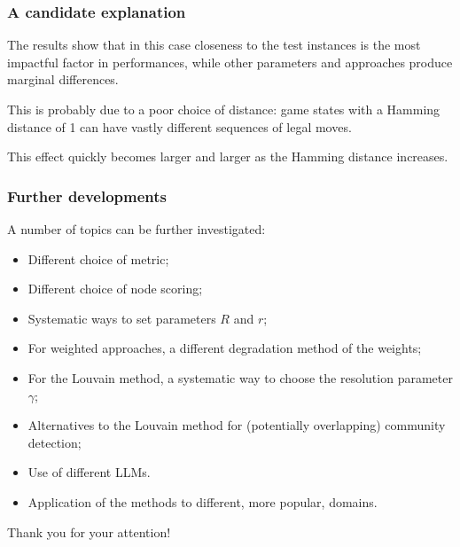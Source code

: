 \documentclass{beamer}
\theoremstyle{definition}
\theoremstyle{plain}
\theoremstyle{Remark}
\begin{document}
	
	\begin{frame}
		\frametitle{A candidate explanation}
		The results show that in this case closeness to the test instances is the most impactful factor in performances, while other parameters and approaches produce marginal differences.\pause \bigskip
		
		This is probably due to a poor choice of distance: game states with a Hamming distance of 1 can have vastly different sequences of legal moves. \pause \bigskip
		
		This effect quickly becomes larger and larger as the Hamming distance increases.
		

		
		
		
		
		
	\end{frame}
		
	\begin{frame}
		\frametitle{Further developments}
		A number of topics can be further investigated:\pause
		\begin{itemize}
			\item Different choice of metric;\pause
			\item Different choice of node scoring;\pause
			\item Systematic ways to set parameters $R$ and $r$;\pause
			\item For weighted approaches, a different degradation method of the weights;\pause
			\item For the Louvain method, a systematic way to choose the resolution parameter $\gamma$;\pause
			\item Alternatives to the Louvain method for (potentially overlapping) community detection;\pause
			\item Use of different LLMs.\pause
			\item Application of the methods to different, more popular, domains.
		\end{itemize}
		
	\end{frame}
\begin{frame}
	\begin{center}
			Thank you for your attention!
	\end{center}

\end{frame}

	
\end{document}
